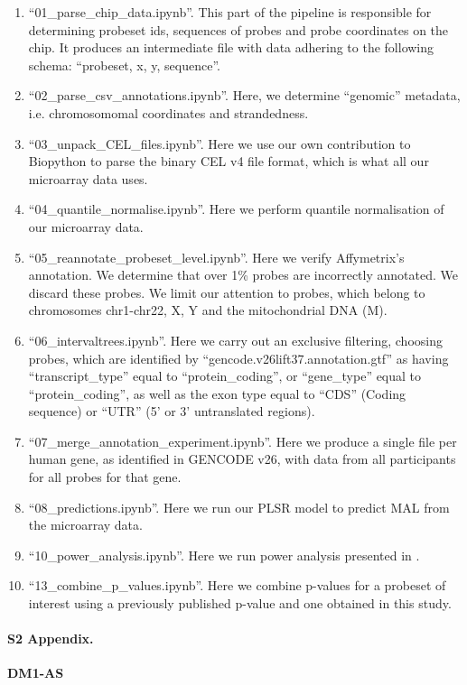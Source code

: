\documentclass[10pt,letterpaper]{article}
\begin{document}
\begin{enumerate}

\item ``01\_parse\_chip\_data.ipynb''. This part of the pipeline is responsible for determining probeset ids, sequences of probes and probe coordinates on the chip. It produces an intermediate file with data adhering to the following schema: ``probeset, x, y, sequence''.
\item ``02\_parse\_csv\_annotations.ipynb''. Here, we determine ``genomic'' metadata, i.e. chromosomomal coordinates and strandedness.
\item ``03\_unpack\_CEL\_files.ipynb''. Here we use our own contribution to Biopython to parse the binary CEL v4 file format, which is what all our microarray data uses.
\item ``04\_quantile\_normalise.ipynb''. Here we perform quantile normalisation of our microarray data.
\item ``05\_reannotate\_probeset\_level.ipynb''. Here we verify Affymetrix's annotation. We determine that over 1\% probes are incorrectly annotated. We discard these probes. We limit our attention to probes, which belong to chromosomes chr1-chr22, X, Y and the mitochondrial DNA (M).
\item ``06\_intervaltrees.ipynb''. Here we carry out an exclusive filtering, choosing probes, which are identified by ``gencode.v26lift37.annotation.gtf'' as having ``transcript\_type'' equal to ``protein\_coding'',  or ``gene\_type'' equal to  ``protein\_coding'', as well as the exon type equal to ``CDS'' (Coding sequence) or ``UTR'' (5' or 3' untranslated regions).
\item ``07\_merge\_annotation\_experiment.ipynb''. Here we produce a single file per human gene, as identified in GENCODE v26, with data from all participants for all probes for that gene.
\item ``08\_predictions.ipynb''. Here we run our PLSR model to predict MAL from the microarray data.
\item ``10\_power\_analysis.ipynb''. Here we run power analysis presented in .
\item ``13\_combine\_p\_values.ipynb''. Here we combine p-values for a probeset of interest using a previously published p-value and one obtained in this study.

\end{enumerate}

\paragraph*{S2 Appendix.}
\label{Appendix3}
{\bf DM1-AS}
\end{document}
